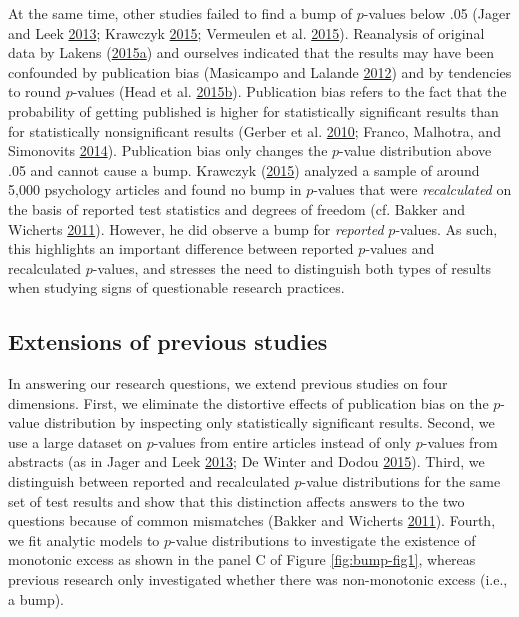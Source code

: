 \documentclass[a5paper]{book}
\begin{document}
At the same time, other studies failed to find a bump of \(p\)-values
below .05 (Jager and Leek
\protect\hyperlink{ref-doi:10.1093ux2fbiostatisticsux2fkxt007}{2013};
Krawczyk
\protect\hyperlink{ref-doi:10.1371ux2fjournal.pone.0127872}{2015};
Vermeulen et al.
\protect\hyperlink{ref-doi:10.1080ux2f19312458.2015.1096333}{2015}).
Reanalysis of original data by Lakens
(\protect\hyperlink{ref-doi:10.1080ux2f17470218.2014.982664}{2015}\protect\hyperlink{ref-doi:10.1080ux2f17470218.2014.982664}{a})
and ourselves indicated that the results may have been confounded by
publication bias (Masicampo and Lalande
\protect\hyperlink{ref-doi:10.1080ux2f17470218.2012.711335}{2012}) and
by tendencies to round \(p\)-values (Head et al.
\protect\hyperlink{ref-doi:10.1371ux2fjournal.pbio.1002106}{2015}\protect\hyperlink{ref-doi:10.1371ux2fjournal.pbio.1002106}{b}).
Publication bias refers to the fact that the probability of getting
published is higher for statistically significant results than for
statistically nonsignificant results (Gerber et al.
\protect\hyperlink{ref-doi:10.1177ux2f1532673x09350979}{2010}; Franco,
Malhotra, and Simonovits
\protect\hyperlink{ref-doi:10.1126ux2fscience.1255484}{2014}).
Publication bias only changes the \(p\)-value distribution above .05 and
cannot cause a bump. Krawczyk
(\protect\hyperlink{ref-doi:10.1371ux2fjournal.pone.0127872}{2015})
analyzed a sample of around 5,000 psychology articles and found no bump
in \(p\)-values that were \emph{recalculated} on the basis of reported
test statistics and degrees of freedom (cf. Bakker and Wicherts
\protect\hyperlink{ref-doi:10.3758ux2fs13428-011-0089-5}{2011}).
However, he did observe a bump for \emph{reported} \(p\)-values. As
such, this highlights an important difference between reported
\(p\)-values and recalculated \(p\)-values, and stresses the need to
distinguish both types of results when studying signs of questionable
research practices.

\subsection{Extensions of previous
studies}\label{extensions-of-previous-studies}

In answering our research questions, we extend previous studies on four
dimensions. First, we eliminate the distortive effects of publication
bias on the \(p\)-value distribution by inspecting only statistically
significant results. Second, we use a large dataset on \(p\)-values from
entire articles instead of only \(p\)-values from abstracts (as in Jager
and Leek
\protect\hyperlink{ref-doi:10.1093ux2fbiostatisticsux2fkxt007}{2013}; De
Winter and Dodou
\protect\hyperlink{ref-doi:10.7717ux2fpeerj.733}{2015}). Third, we
distinguish between reported and recalculated \(p\)-value distributions
for the same set of test results and show that this distinction affects
answers to the two questions because of common mismatches (Bakker and
Wicherts
\protect\hyperlink{ref-doi:10.3758ux2fs13428-011-0089-5}{2011}). Fourth,
we fit analytic models to \(p\)-value distributions to investigate the
existence of monotonic excess as shown in the panel C of Figure
\ref{fig:bump-fig1}, whereas previous research only investigated whether
there was non-monotonic excess (i.e., a bump).
\end{document}
